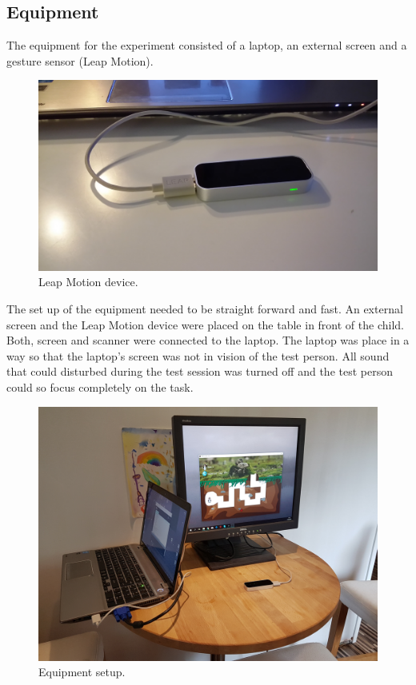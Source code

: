 


\subsection{Equipment}

The equipment for the experiment consisted of a laptop, an external screen and a gesture sensor (Leap Motion). 

\begin{figure}[h]  %
  \centering
  \includegraphics[width=.5\textwidth]{figures/LMdevice.jpg}
  \caption[Leap Motion device.]{Leap Motion device.}
  \label{fig:leapmotiondevice}
\end{figure}

The set up of the equipment needed to be straight forward and fast. An external screen and the Leap Motion device were placed on the table in front of the child. Both, screen and scanner were connected to the laptop. The laptop was place in a way so that the laptop’s screen was not in vision of the test person. All sound that could disturbed during the test session was turned off and the test person could so focus completely on the task.

\begin{figure}[h]  %
  \centering
  \includegraphics[width=.5\textwidth]{figures/setup.jpg}
  \caption[Equipment setup.]{Equipment setup.}
  \label{fig:equipmentsetup}
\end{figure}


